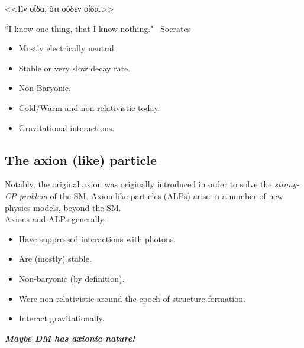 \documentclass[10pt,utf8,compress,xcolor=dvipsnames]{beamer}
\begin{document}
\begin{frame}{\insertsubsectionhead}
	\begin{center}
		\begin{otherlanguage}{greek}
			<<Έν οἶδα, ὅτι οὐδὲν οἶδα.>>\\
		\end{otherlanguage}		
	``I know one thing,  that I know nothing."
	\flushright --Socrates \pause
	\end{center}

	\begin{itemize}
		\item Mostly electrically neutral.
		\item Stable or very slow decay rate. 
		\item Non-Baryonic.
		\item Cold/Warm and non-relativistic today.
		\item Gravitational interactions.
	\end{itemize}
	
\end{frame}

\subsection{The axion (like) particle}
\begin{frame}{\insertsubsectionhead}
%
Notably, the original axion was originally introduced in order to solve the {\em strong-CP problem} of the SM.
Axion-like-particles (ALPs) arise in a number of new physics models, beyond the SM.  \\[0.5cm]

Axions and ALPs generally:
%
	\begin{itemize}
	\item Have suppressed interactions with photons.
	\item Are (mostly) stable. 
	\item Non-baryonic (by definition).
	\item Were non-relativistic around the epoch of structure formation. 
	\item Interact gravitationally.\\[1cm]
	\end{itemize}

\pause
\begin{center}
	{\bf \em Maybe DM has axionic nature!}	
\end{center}

\end{frame}
\end{document}
